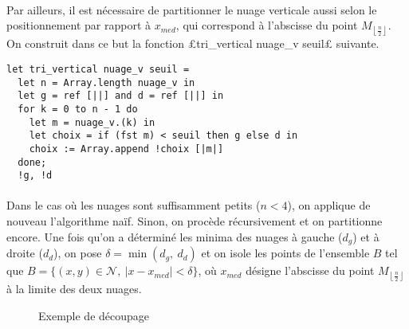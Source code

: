 \documentclass{article}
\newcommand{\ent}[1]{\left\lfloor #1\right\rfloor}
\begin{document}
  \paragraph{} Par ailleurs, il est nécessaire de partitionner le nuage verticale aussi selon le positionnement par rapport à $x_{med}$, qui correspond à l'abscisse du point $M_{\ent{\frac{n}{2}}}$. On construit dans ce but la fonction £tri_vertical nuage_v seuil£ suivante.

  \begin{lstlisting}
let tri_vertical nuage_v seuil =
  let n = Array.length nuage_v in
  let g = ref [||] and d = ref [||] in
  for k = 0 to n - 1 do
    let m = nuage_v.(k) in
    let choix = if (fst m) < seuil then g else d in
    choix := Array.append !choix [|m|]
  done;
  !g, !d
  \end{lstlisting}

  \paragraph{} Dans le cas où les nuages sont suffisamment petits ($n < 4$), on applique de nouveau l'algorithme naïf. Sinon, on procède récursivement et on partitionne encore. Une fois qu'on a déterminé les minima des nuages à gauche ($d_g$) et à droite ($d_d$), on pose $\delta = \min(d_g,\ d_d)$ et on isole les points de l'ensemble $B$ tel que $B = \{(x, y)\in\mathcal{N},\ |x-x_{med}|<\delta\}$, où $x_{med}$ désigne l'abscisse du point $M_{\ent{\frac{n}{2}}}$ à la limite des deux nuages.


  \begin{figure}
    \begin{center}
      \caption{Exemple de découpage}\label{decoupage}
    \end{center}
  \end{figure}
\end{document}
